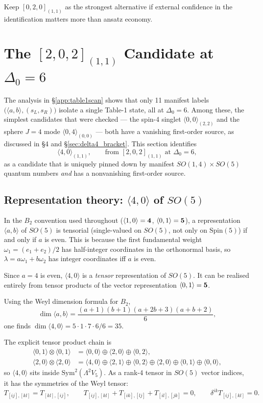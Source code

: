 \documentclass[12pt]{article}
\def\be{\begin{equation}}
\def\ee{\end{equation}}
\def\ie{\begin{equation}\begin{aligned}}
\def\fe{\end{aligned}\end{equation}}
\newcommand{\D}{\ensuremath{\Delta}}
\begin{document}
Keep $[0,2,0]_{(1,1)}$ as the strongest alternative if external confidence in the identification
matters more than ansatz economy.

\section{The \texorpdfstring{$[2,0,2]_{(1,1)}$}{[2,0,2](1,1)} Candidate at \texorpdfstring{$\D_0=6$}{Delta0=6}}
\label{sec:202_11}

The analysis in \S\ref{app:table1scan} shows that only 11 manifest labels
$\big(\langle a,b\rangle,(s_L,s_R)\big)$ isolate a single Table-1 state, all at $\D_0=6$.
Among these, the simplest candidates that were checked --- the spin-4 singlet
$\langle 0,0\rangle_{(2,2)}$ and the sphere $J\!=\!4$ mode $\langle 0,4\rangle_{(0,0)}$
--- both have a vanishing first-order source, as discussed in \S4 and \S\ref{sec:delta4_bracket}.
This section identifies
\be
\langle 4,0\rangle_{(1,1)},\qquad\text{from }[2,0,2]_{(1,1)}\text{ at }\D_0=6,
\ee
as a candidate that is uniquely pinned down by manifest $SO(1,4)\times SO(5)$
quantum numbers \emph{and} has a nonvanishing first-order source.

\subsection{Representation theory: \texorpdfstring{$\langle 4,0\rangle$}{<4,0>} of \texorpdfstring{$SO(5)$}{SO(5)}}

In the $B_2$ convention used throughout ($\langle 1,0\rangle={\bf 4}$, $\langle 0,1\rangle={\bf 5}$),
a representation $\langle a,b\rangle$ of $SO(5)$ is tensorial (single-valued on $SO(5)$, not only
on $\mathrm{Spin}(5)$) if and only if $a$ is even.
This is because the first fundamental weight $\omega_1=(e_1+e_2)/2$
has half-integer coordinates in the orthonormal basis, so $\lambda=a\omega_1+b\omega_2$ has
integer coordinates iff $a$ is even.

Since $a=4$ is even, $\langle 4,0\rangle$ is a \emph{tensor} representation of $SO(5)$.
It can be realised entirely from tensor products of the vector representation $\langle 0,1\rangle={\bf 5}$.

Using the Weyl dimension formula for $B_2$,
\be
\dim\langle a,b\rangle = \frac{(a+1)(b+1)(a+2b+3)(a+b+2)}{6},
\ee
one finds $\dim\langle 4,0\rangle = 5\cdot 1\cdot 7\cdot 6/6 = 35$.

The explicit tensor product chain is
\ie
\langle 0,1\rangle\otimes\langle 0,1\rangle
&= \langle 0,0\rangle\oplus\langle 2,0\rangle\oplus\langle 0,2\rangle,\\
\langle 2,0\rangle\otimes\langle 2,0\rangle
&= \langle 4,0\rangle\oplus\langle 2,1\rangle\oplus\langle 0,2\rangle
\oplus\langle 2,0\rangle\oplus\langle 0,1\rangle\oplus\langle 0,0\rangle,
\fe
so $\langle 4,0\rangle$ sits inside $\mathrm{Sym}^2(\Lambda^2 V_5)$.
As a rank-4 tensor in $SO(5)$ vector indices, it has the symmetries of the Weyl tensor:
\be
T_{[ij],[kl]}=T_{[kl],[ij]},\qquad
T_{[ij],[kl]}+T_{[ik],[lj]}+T_{[il],[jk]}=0,\qquad
\delta^{ik}T_{[ij],[kl]}=0.
\ee
\end{document}
